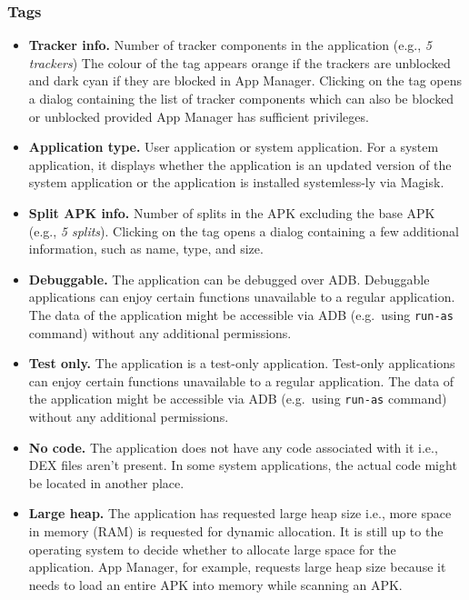 \subsubsection{Tags}\label{subsubsec:tags} %
\begin{itemize}
    \item \textbf{Tracker info.} Number of tracker components in the application (e.g., \textit{5 trackers}) The colour
    of the tag appears orange if the trackers are unblocked and dark cyan if they are blocked in App Manager.
    Clicking on the tag opens a dialog containing the list of tracker components which can also be blocked or unblocked
    provided App Manager has sufficient privileges.

    \item \textbf{Application type.} User application or system application. For a system
    application, it displays whether the application is an updated version of the system application
    or the application is installed systemless-ly via Magisk.

    \item \textbf{Split APK info.} Number of splits in the APK excluding the base APK (e.g., \textit{5 splits}).
    Clicking on the tag opens a dialog containing a few additional information, such as name, type, and size.

    \item \textbf{Debuggable.} The application can be debugged over ADB\@. Debuggable applications can enjoy certain
    functions unavailable to a regular application. The data of the application might be accessible via ADB (e.g.\ using
    \texttt{run-as} command) without any additional permissions.

    \item \textbf{Test only.} The application is a test-only application. Test-only applications can enjoy certain
    functions unavailable to a regular application. The data of the application might be accessible via ADB (e.g.\ using
    \texttt{run-as} command) without any additional permissions.

    \item \textbf{No code.} The application does not have any code associated with it i.e., DEX files aren't present.
    In some system applications, the actual code might be located in another place.

    \item \textbf{Large heap.} The application has requested large heap size i.e., more space in memory (RAM) is
    requested for dynamic allocation. It is still up to the operating system to decide whether to allocate large space
    for the application. App Manager, for example, requests large heap size because it needs to load an entire APK
    into memory while scanning an APK\@.


\end{itemize}
